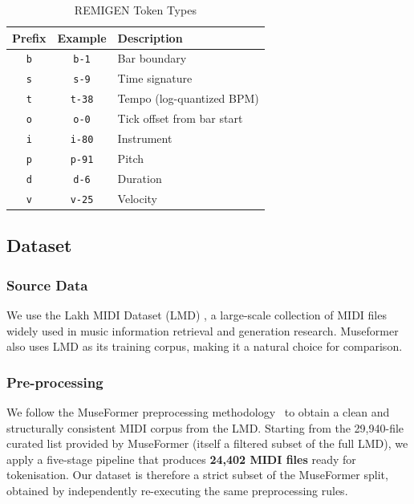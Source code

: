 \documentclass[conference]{IEEEtran}
\begin{document}
\begin{table}[htbp]
\centering
\caption{REMIGEN Token Types}
\label{tab:remigen_tokens}
\begin{tabular}{ccl}
\toprule
\textbf{Prefix} & \textbf{Example} & \textbf{Description} \\
\midrule
\texttt{b} & \texttt{b-1}   & Bar boundary \\
\texttt{s} & \texttt{s-9}   & Time signature \\
\texttt{t} & \texttt{t-38}  & Tempo (log-quantized BPM) \\
\texttt{o} & \texttt{o-0}   & Tick offset from bar start \\
\texttt{i} & \texttt{i-80}  & Instrument \\
\texttt{p} & \texttt{p-91}  & Pitch \\
\texttt{d} & \texttt{d-6}   & Duration \\
\texttt{v} & \texttt{v-25}  & Velocity \\
\bottomrule
\end{tabular}
\end{table}

\subsection{Dataset}
\label{sec:dataset}

\subsubsection{Source Data}
We use the Lakh MIDI Dataset (LMD) \cite{raffel2016lmd}, a large-scale collection of MIDI files widely used in music information retrieval and generation research. Museformer \cite{yu2022museformer} also uses LMD as its training corpus, making it a natural choice for comparison.

\subsubsection{Pre-processing}
\label{sec:preprocessing}

We follow the MuseFormer preprocessing methodology~\cite{yu2022museformer} to obtain a
clean and structurally consistent MIDI corpus from the LMD.
Starting from the 29,940-file curated list provided by MuseFormer (itself a filtered
subset of the full LMD), we apply a five-stage pipeline that produces
\textbf{24,402 MIDI files} ready for tokenisation.
Our dataset is therefore a strict subset of the MuseFormer split, obtained by
independently re-executing the same preprocessing rules.
\end{document}
